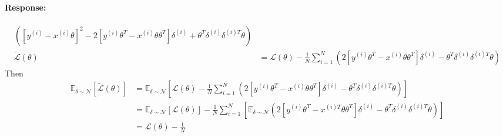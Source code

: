 \documentclass{article}
\newenvironment{response}{\begin{responseframe}\vspace{-10pt}\paragraph{Response:}}{\end{responseframe}}
\begin{document}
\begin{enumerate}
\begin{enumerate}
\begin{adjustwidth}{-7.7em}{-3em}
\begin{response}
\begin{align*}
                            \left( 
                                \left[ y^{(i)} - x^{(i)} \theta \right]^2
                                -
                                2\left[ y^{(i)} \theta^T - x^{(i)} \theta \theta^T \right]  \delta^{(i)}
                                + 
                                \theta^T \delta^{(i)} \delta^{(i)T} \theta 
                            \right) \\
                            \tilde{\mathcal{L}} (\theta) 
                            &= \mathcal{L} (\theta) - \frac{1}{N} 
                            \sum^{N}_{i = 1} 
                            \left(
                                2\left[ y^{(i)} \theta^T - x^{(i)} \theta \theta^T \right] \delta^{(i)}
                                -
                                \theta^T \delta^{(i)} \delta^{(i)T} \theta 
                            \right)
                            \end{align*}
                            Then
                            \begin{align*}
                                \mathbb{E}_{\delta \sim \mathcal{N}} [\tilde{\mathcal{L}} (\theta)]
                            &= 
                            \mathbb{E}_{\delta \sim \mathcal{N}} 
                            \left[
                                \mathcal{L} (\theta) - \frac{1}{N} 
                                \sum^{N}_{i = 1} 
                                \left(
                                    2\left[ y^{(i)} \theta^T - x^{(i)} \theta \theta^T \right] \delta^{(i)}
                                    -
                                    \theta^T \delta^{(i)} \delta^{(i)T} \theta 
                                \right) 
                            \right]
                            \\
                            &= 
                            \mathbb{E}_{\delta \sim \mathcal{N}} [\mathcal{L} (\theta)] 
                            - \frac{1}{N}
                            \sum^{N}_{i = 1} 
                            \left[
                                \mathbb{E}_{\delta \sim \mathcal{N}}
                                \left(
                                    2\left[ y^{(i)} \theta^T - x^{(i)T} \theta \theta^T \right] \delta^{(i)}
                                    -
                                    \theta^T \delta^{(i)} \delta^{(i)T} \theta 
                                \right)
                            \right] \\
                            &= 
                            \mathcal{L} (\theta) - \frac{1}{N} 

\end{align*}
\end{response}
\end{adjustwidth}
\end{enumerate}
\end{enumerate}
\end{document}
